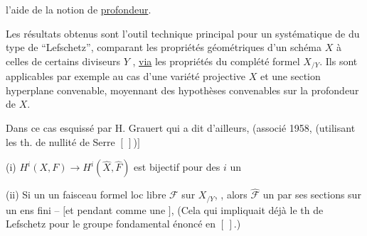 
l'aide de la notion de \uline{profondeur}.

Les résultats  obtenus sont l'outil technique principal pour un   systématique de   du type de ``Lefschetz'', comparant les propriétés géométriques d'un schéma $X$ à celles de certains  diviseurs $Y$   , \uline{via} les propriétés du complété formel $X_{/Y}$.   Ils sont applicables par exemple  au cas d'une variété projective $X$ et une section hyperplane convenable, moyennant des hypothèses  convenables sur la profondeur de $X$. 

Dans ce cas     esquissé par H. Grauert qui a dit d'ailleurs,  (associé   1958, (utilisant les th. de  nullité de Serre $[\,]$)$]$    

(i)  $H^i(X,F)\to H^i(\hat X,\hat F)$ est bijectif pour des  $i$ \unsure{$\leq$} un  

(ii) Si un   un faisceau formel loc libre $\mathcal F$ sur $X_{/Y}$,    , alors $\hat{\mathcal F}$  un  par ses sections \unsure{$[\exists n]$} sur un ens fini -- $[$et   pendant  comme une $]$,    (Cela qui impliquait  déjà le th de Lefschetz pour le groupe fondamental énoncé en $[\,]$.)

